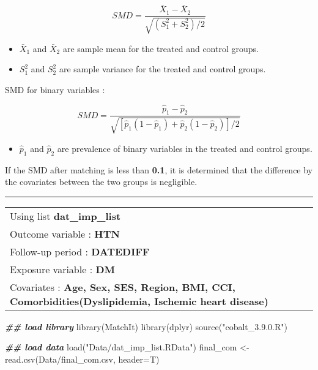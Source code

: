 \documentclass[
]{book}
\newenvironment{Shaded}{\begin{snugshade}}{\end{snugshade}}
\newcommand{\AttributeTok}[1]{\textcolor[rgb]{0.77,0.63,0.00}{#1}}
\newcommand{\DocumentationTok}[1]{\textcolor[rgb]{0.56,0.35,0.01}{\textbf{\textit{#1}}}}
\newcommand{\FunctionTok}[1]{\textcolor[rgb]{0.00,0.00,0.00}{#1}}
\newcommand{\NormalTok}[1]{#1}
\newcommand{\OtherTok}[1]{\textcolor[rgb]{0.56,0.35,0.01}{#1}}
\newcommand{\StringTok}[1]{\textcolor[rgb]{0.31,0.60,0.02}{#1}}
\providecommand{\tightlist}{%
  \setlength{\itemsep}{0pt}\setlength{\parskip}{0pt}}
\begin{document}
\[SMD=\frac{\bar X_1-\bar X_2}{\sqrt{(S^2_1+S^2_2)/2}}\]

\begin{itemize}
\tightlist
\item
  \(\bar X_1\) and \(\bar X_2\) are sample mean for the treated and control groups.\\
\item
  \(S^2_1\) and \(S^2_2\) are sample variance for the treated and control groups.
\end{itemize}

SMD for binary variables :

\[SMD=\frac{\hat p_1-\hat p_2}{\sqrt{[\hat p_1(1-\hat p_1)+\hat p_2(1-\hat p_2)]/2}}\]

\begin{itemize}
\tightlist
\item
  \(\hat p_1\) and \(\hat p_2\) are prevalence of binary variables in the treated and control groups.
\end{itemize}

If the SMD after matching is less than \textbf{0.1}, it is determined that the difference by the covariates between the two groups is negligible.

\begin{center}\rule{0.5\linewidth}{0.5pt}\end{center}

\begin{longtable}[]{@{}l@{}}
\toprule()
\endhead
Using list \textbf{dat\_imp\_list} \\
Outcome variable : \textbf{HTN} \\
Follow-up period : \textbf{DATEDIFF} \\
Exposure variable : \textbf{DM} \\
Covariates : \textbf{Age, Sex, SES, Region, BMI, CCI, Comorbidities(Dyslipidemia, Ischemic heart disease)} \\
\bottomrule()
\end{longtable}

\begin{Shaded}
\begin{Highlighting}[]
\DocumentationTok{\#\# load library}
\FunctionTok{library}\NormalTok{(MatchIt)}
\FunctionTok{library}\NormalTok{(dplyr)}
\FunctionTok{source}\NormalTok{(}\StringTok{"cobalt\_3.9.0.R"}\NormalTok{)}
\end{Highlighting}
\end{Shaded}

\begin{Shaded}
\begin{Highlighting}[]
\DocumentationTok{\#\# load data}
\FunctionTok{load}\NormalTok{(}\StringTok{"Data/dat\_imp\_list.RData"}\NormalTok{)}
\NormalTok{final\_com }\OtherTok{\textless{}{-}} \FunctionTok{read.csv}\NormalTok{(}\StringTok{\textquotesingle{}Data/final\_com.csv\textquotesingle{}}\NormalTok{, }\AttributeTok{header=}\NormalTok{T)}
\end{Highlighting}
\end{Shaded}
\end{document}
